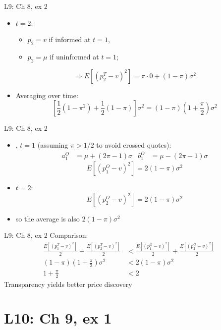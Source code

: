 \documentclass[english,10pt
,aspectratio=169
]{beamer}
\begin{document}
\begin{frame}{L9: Ch 8, ex 2}
	\begin{itemize}
		\item $t=2$:
		\begin{itemize}
			\item $p_2 = v$ if informed at $t=1$,
			\item $p_2 = \mu$ if uninformed at $t=1$;
		\end{itemize}
		\[ \Rightarrow E\left[ (p_{2}^{T}-v)^{2}\right] = \pi \cdot 0 + (1-\pi) \sigma^2 \]
		\item Averaging over time:
		\[ \left[\frac{1}{2}(1-\pi^2)+\frac{1}{2}(1-\pi) \right] \sigma^2 = (1-\pi)\left(1+\frac{\pi}{2}\right) \sigma^2 \]
	\end{itemize}
\end{frame}


\begin{frame}{L9: Ch 8, ex 2}
	\begin{itemize}
		\item {}, $t=1$ (assuming $\pi > 1/2$ to avoid crossed quotes):
		\begin{align*}
			a_1^O &= \mu + (2\pi-1)\sigma & b_1^O &= \mu - (2\pi-1)\sigma
		\end{align*}
		\[ E\left[ (p_{1}^{O}-v)^{2}\right] = 2(1-\pi)\sigma^2 \]
		\pause
		\item $t=2$:
		\[ E\left[ (p_{2}^{O}-v)^{2}\right] = 2(1-\pi)\sigma^2 \]
		\item so the average is also $2(1-\pi)\sigma^2$
	\end{itemize}
\end{frame}


\begin{frame}{L9: Ch 8, ex 2}
	Comparison:
	\begin{align*}
		\frac{E\left[ (p_{1}^{T}-v)^{2} \right]}{2} + \frac{E\left[ (p_{2}^{T}-v)^{2} \right]}{2} &< \frac{E\left[ (p_{1}^{O}-v)^{2} \right]}{2} + \frac{E\left[ (p_{2}^{O}-v)^{2} \right]}{2}
		\\
		(1-\pi)\left(1+\frac{\pi}{2}\right) \sigma^2 &< 2(1-\pi)\sigma^2
		\\
		1+\frac{\pi}{2} &< 2
	\end{align*}
	Transparency yields better price discovery
\end{frame}


\section{L10: Ch 9, ex 1}
\end{document}
